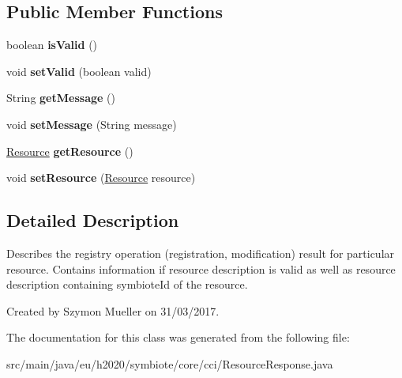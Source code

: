\subsection*{Public Member Functions}
\begin{DoxyCompactItemize}
\item 
\mbox{\label{classeu_1_1h2020_1_1symbiote_1_1core_1_1cci_1_1ResourceResponse_a33c98d7cf8a528de28f4af47d8c29229}} 
boolean {\bfseries is\+Valid} ()
\item 
\mbox{\label{classeu_1_1h2020_1_1symbiote_1_1core_1_1cci_1_1ResourceResponse_ab4b31b0f9ea2d5892cea3a49043db83c}} 
void {\bfseries set\+Valid} (boolean valid)
\item 
\mbox{\label{classeu_1_1h2020_1_1symbiote_1_1core_1_1cci_1_1ResourceResponse_a1a8ed91ea3f795ac675f793a6314b1fb}} 
String {\bfseries get\+Message} ()
\item 
\mbox{\label{classeu_1_1h2020_1_1symbiote_1_1core_1_1cci_1_1ResourceResponse_a0c3936c93e9888fe02c4c537e9a9a96d}} 
void {\bfseries set\+Message} (String message)
\item 
\mbox{\label{classeu_1_1h2020_1_1symbiote_1_1core_1_1cci_1_1ResourceResponse_a3dce31293af673b0132448d380fd816f}} 
\hyperlink{classeu_1_1h2020_1_1symbiote_1_1model_1_1cim_1_1Resource}{Resource} {\bfseries get\+Resource} ()
\item 
\mbox{\label{classeu_1_1h2020_1_1symbiote_1_1core_1_1cci_1_1ResourceResponse_a716d3ea2eb15204eabb5f1c23916296f}} 
void {\bfseries set\+Resource} (\hyperlink{classeu_1_1h2020_1_1symbiote_1_1model_1_1cim_1_1Resource}{Resource} resource)
\end{DoxyCompactItemize}


\subsection{Detailed Description}
Describes the registry operation (registration, modification) result for particular resource. Contains information if resource description is valid as well as resource description containing symbiote\+Id of the resource.

Created by Szymon Mueller on 31/03/2017. 

The documentation for this class was generated from the following file\+:\begin{DoxyCompactItemize}
\item 
src/main/java/eu/h2020/symbiote/core/cci/Resource\+Response.\+java\end{DoxyCompactItemize}
